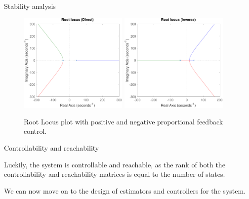 \begin{frame}{Stability analysis}

    \begin{figure}[H]
        \centering
        \includegraphics[width=0.47\textwidth]{./img/MATLAB/analysis/root_locus_direct.pdf}
        \hfill
        \includegraphics[width=0.47\textwidth]{./img/MATLAB/analysis/root_locus_inverse.pdf}
        \caption{Root Locus plot with positive and negative proportional feedback control.}
        \label{fig:root_locus_plot}
    \end{figure}


\end{frame}



\begin{frame}{Controllability and reachability}

    Luckily, the system is controllable and reachable, as the rank of both the controllability and reachability matrices is equal to the number of states.

    \vspace{9pt}

    We can now move on to the design of estimators and controllers for the system.

\end{frame}